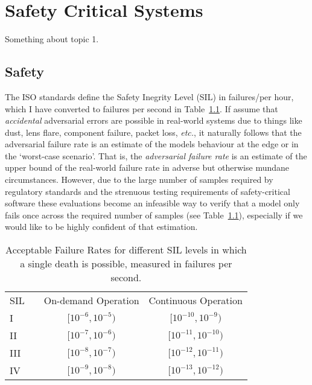 \chapter{Safety Critical Systems}
Something about topic 1. \lipsum[1]


\section{Safety}
The ISO standards \cite{iso26262} define the Safety Inegrity Level (SIL) in failures/per hour, which I have converted to failures per second in Table~\ref{tab:rate}. If assume that \textit{accidental} adversarial errors are possible in real-world systems due to things like dust, lens flare, component failure, packet loss, \textit{etc.}, it naturally follows that the adversarial failure rate is an estimate of the models behaviour at the edge or in the `worst-case scenario'. That is, the \textit{adversarial failure rate} is an estimate of the upper bound of the real-world failure rate in adverse but otherwise mundane circumstances. However, due to the large number of samples required by regulatory standards  and the strenuous testing requirements of safety-critical software these evaluations become an infeasible way to verify that a model only fails once across the required number of samples (see Table~\ref{tab:rate}), especially if we would like to be highly confident of that estimation.

\begin{table}[!ht]
    \begin{center}
        \caption{Acceptable Failure Rates for different SIL levels in which a single death is possible, measured in failures per second.}
        \begin{tabular}{l c cc}
            \toprule
            SIL  && On-demand Operation   & Continuous Operation \\
            \cmidrule{1-1} \cmidrule{3-4}
            I     && $[10^{-6}, 10^{-5})$  & $[10^{-10}, 10^{-9})$ \\
            II    && $[10^{-7}, 10^{-6})$  & $[10^{-11}, 10^{-10})$ \\
            III   && $[10^{-8}, 10^{-7})$  & $[10^{-12}, 10^{-11})$ \\
            IV    && $[10^{-9}, 10^{-8})$  & $[10^{-13}, 10^{-12})$ \\
            \bottomrule
        \end{tabular}
        \label{tab:rate}
    \end{center}
\end{table} 


